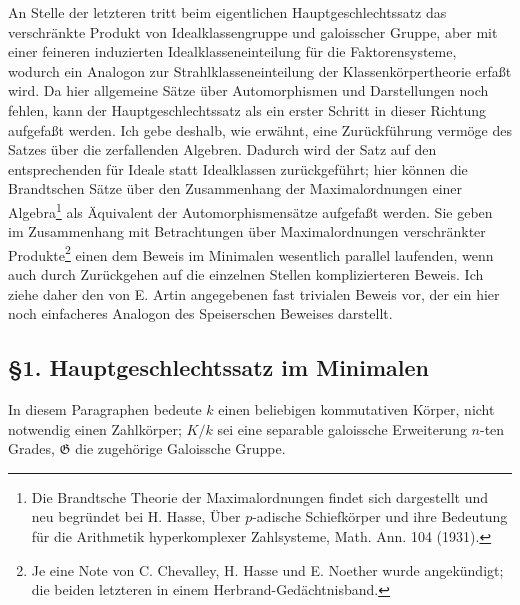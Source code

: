 \documentclass[11pt]{article}
\providecommand{\Gg}{\mathfrak G}
\begin{document}
An Stelle der letzteren tritt beim eigentlichen Hauptgeschlechtssatz das verschränkte Produkt von Idealklassengruppe und galoisscher Gruppe, aber mit einer feineren induzierten Idealklasseneinteilung für die Faktorensysteme, wodurch ein Analogon zur Strahlklasseneinteilung der Klassenkörpertheorie erfaßt wird. Da hier allgemeine Sätze über Automorphismen und Darstellungen noch fehlen, kann der Hauptgeschlechtssatz als ein erster Schritt in dieser Richtung aufgefaßt werden. Ich gebe deshalb, wie erwähnt, eine Zurückführung vermöge des Satzes über die zerfallenden Algebren. Dadurch wird der Satz auf den entsprechenden für Ideale statt Idealklassen zurückgeführt; hier können die Brandtschen Sätze über den Zusammenhang der Maximalordnungen einer Algebra\footnote{Die Brandtsche Theorie der Maximalordnungen findet sich dargestellt und neu begründet bei H. Hasse, Über \(p\)-adische Schiefkörper und ihre Bedeutung für die Arithmetik hyperkomplexer Zahlsysteme, Math. Ann. 104 (1931).} als Äquivalent der Automorphismensätze aufgefaßt werden. Sie geben im Zusammenhang mit Betrachtungen über Maximalordnungen verschränkter Produkte\footnote{Je eine Note von C. Chevalley, H. Hasse und E. Noether wurde angekündigt; die beiden letzteren in einem Herbrand-Gedächtnisband.} einen dem Beweis im Minimalen wesentlich parallel laufenden, wenn auch durch Zurückgehen auf die einzelnen Stellen komplizierteren Beweis. Ich ziehe daher den von E. Artin angegebenen fast trivialen Beweis vor, der ein hier noch einfacheres Analogon des Speiserschen Beweises darstellt.

\subsection*{§1. Hauptgeschlechtssatz im Minimalen}

In diesem Paragraphen bedeute \(k\) einen beliebigen kommutativen Körper, nicht notwendig einen Zahlkörper; \(K/k\) sei eine separable galoissche Erweiterung \(n\)-ten Grades, \(\Gg\) die zugehörige Galoissche Gruppe.
\end{document}
